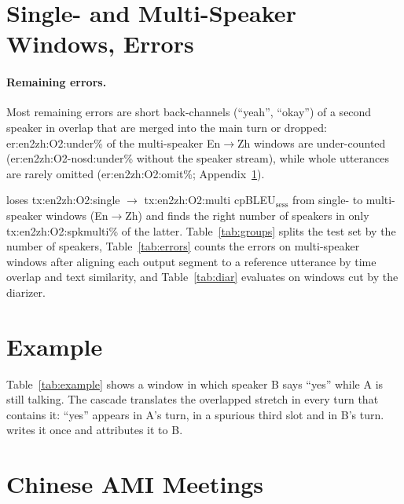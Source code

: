 \section{Single- and Multi-Speaker Windows, Errors}
\label{app:more}





\paragraph{Remaining errors.} Most remaining errors are short back-channels (``yeah'', ``okay'') of a second speaker in
overlap that are merged into the main turn or dropped: \num{er:en2zh:O2:under}\% of the multi-speaker En$\rightarrow$Zh
windows are under-counted (\num{er:en2zh:O2-nosd:under}\% without the speaker stream), while whole utterances are
rarely omitted (\num{er:en2zh:O2:omit}\%; Appendix~\ref{app:more}).

\sys{} loses \num{tx:en2zh:O2:single} $\rightarrow$ \num{tx:en2zh:O2:multi} cpBLEU$_\text{sess}$ from single- to
multi-speaker windows (En$\rightarrow$Zh) and finds the right number of speakers in only \num{tx:en2zh:O2:spkmulti}\% of
the latter. Table~\ref{tab:groups} splits the test set by the number of speakers, Table~\ref{tab:errors} counts the errors on
multi-speaker windows after aligning each output segment to a reference utterance by time overlap and text
similarity, and Table~\ref{tab:diar} evaluates on windows cut by the diarizer.

\section{Example}
\label{app:example}

Table~\ref{tab:example} shows a window in which speaker B says ``yes'' while A is still talking. The cascade translates
the overlapped stretch in every turn that contains it: ``yes'' appears in A's turn, in a spurious third slot and in B's
turn. \sys{} writes it once and attributes it to B.



\section{Chinese AMI Meetings}
\label{app:zhdata}

